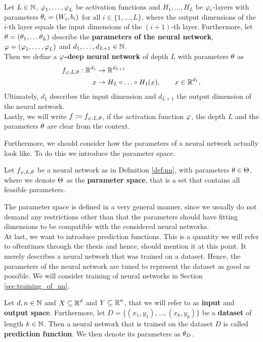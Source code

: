 \begin{definition}\label{def:nn}
Let $L\in\operatorname{\mathbb{N}}$, $\operatorname{\varphi}_1,\ldots,\operatorname{\varphi}_L$ be activation functions and $H_1, \ldots, H_L$ be $\operatorname{\varphi}_i$-layers with parameters $\theta_i = (W_i, b_i)$ for all $i \in \{1,\ldots,L\}$, where the output dimensions of the $i$-th layer equals the input dimensions of the $(i+1)$-th layer. Furthermore, let  $\theta = (\theta_1, \ldots \theta_L)$ describe the \textbf{parameters of the neural network}, $\operatorname{\varphi} = (\operatorname{\varphi}_1, \ldots, \operatorname{\varphi}_L)$ and $d_1,\ldots,d_{L+1}\in\operatorname{\mathbb{N}}$.\\
Then we define a \textbf{$\operatorname{\varphi}$-deep neural network} of depth $L$ with parameters $\theta$ as
\begin{align}
f_{\operatorname{\varphi}, L, \theta}: \operatorname{\mathbb{R}}^{d_1} &\to \operatorname{\mathbb{R}}^{d_{L+1}}\nonumber\\
x &\to H_L \circ \ldots \circ H_1 (x), \qquad x \in \operatorname{\mathbb{R}}^{d_1},
\end{align}
Ultimately, $d_1$ describes the input dimension and $d_{L+1}$ the output dimension of the neural network.\\
Lastly, we will write $f\coloneqq f_{\operatorname{\varphi}, L, \theta}$, if the activation function $\operatorname{\varphi}$, the depth $L$ and the parameters $\theta$ are clear from the context.
\end{definition}

Furthermore, we should consider how the parameters of a neural network actually look like. To do this we introduce the parameter space.

\begin{definition}
Let $f_{\operatorname{\varphi}, L, \theta}$ be a neural network as in Definition \ref{def:nn}, with parameters $\theta\in\operatorname{\Theta}$, where we denote $\operatorname{\Theta}$ as the \textbf{parameter space}, that is a set that contains all feasible parameters.
\end{definition}

The parameter space is defined in a very general manner, since we usually do not demand any restrictions other than that the parameters should have fitting dimensions to be compatible with the considered neural networks.\\
At last, we want to introduce prediction functions. This is a quantity we will refer to oftentimes through the thesis and hence, should mention it at this point. It merely describes a neural network that was trained on a dataset. Hence, the parameters of the neural network are tuned to represent the dataset as good as possible. We will consider training of neural networks in Section \ref{sec:training_of_nn}.

\begin{definition}
Let $d, n \in \operatorname{\mathbb{N}}$ and $X\subseteq \operatorname{\mathbb{R}}^d$ and $Y \subseteq \operatorname{\mathbb{R}}^n$, that we will refer to as \textbf{input} and \textbf{output space}. Furthermore, let $D=\{(x_1,y_1),\ldots, (x_k,y_k)\}$ be a \textbf{dataset} of length $k\in\operatorname{\mathbb{N}}$. Then a neural network that is trained on the dataset $D$ is called \textbf{prediction function}. We then denote its parameters as $\theta_{D}$.
\end{definition}

